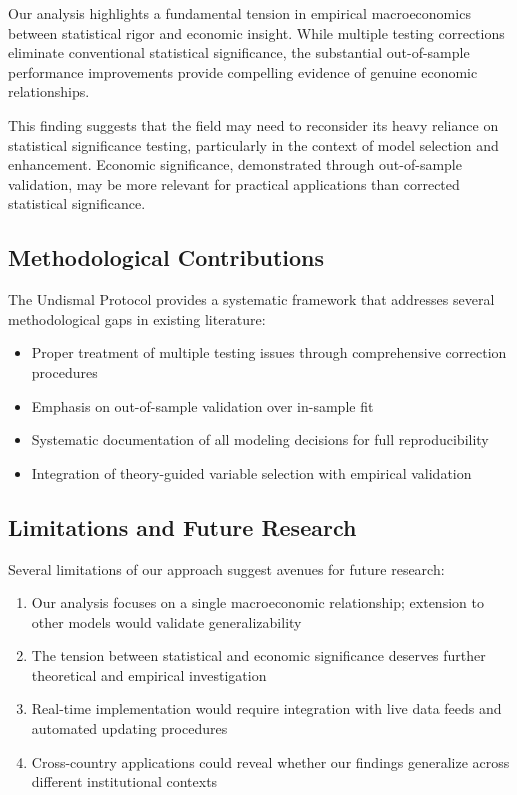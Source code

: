 \documentclass[12pt]{article}
\begin{document}
Our analysis highlights a fundamental tension in empirical macroeconomics between statistical rigor and economic insight. While multiple testing corrections eliminate conventional statistical significance, the substantial out-of-sample performance improvements provide compelling evidence of genuine economic relationships.

This finding suggests that the field may need to reconsider its heavy reliance on statistical significance testing, particularly in the context of model selection and enhancement. Economic significance, demonstrated through out-of-sample validation, may be more relevant for practical applications than corrected statistical significance.

\subsection{Methodological Contributions}

The Undismal Protocol provides a systematic framework that addresses several methodological gaps in existing literature:

\begin{itemize}
\item Proper treatment of multiple testing issues through comprehensive correction procedures
\item Emphasis on out-of-sample validation over in-sample fit
\item Systematic documentation of all modeling decisions for full reproducibility
\item Integration of theory-guided variable selection with empirical validation
\end{itemize}

\subsection{Limitations and Future Research}

Several limitations of our approach suggest avenues for future research:

\begin{enumerate}
\item Our analysis focuses on a single macroeconomic relationship; extension to other models would validate generalizability
\item The tension between statistical and economic significance deserves further theoretical and empirical investigation
\item Real-time implementation would require integration with live data feeds and automated updating procedures
\item Cross-country applications could reveal whether our findings generalize across different institutional contexts
\end{enumerate}
\end{document}
